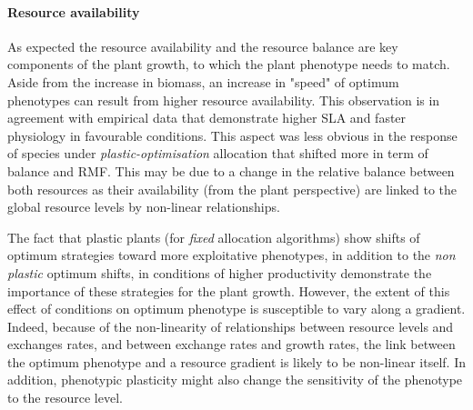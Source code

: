 \paragraph{Resource availability}

As expected the resource availability and the resource balance are key components of the plant growth, to which the plant phenotype needs to match. Aside from the increase in biomass, an increase in "speed" of optimum phenotypes can result from higher resource availability. This observation is in agreement with empirical data that demonstrate higher SLA and faster physiology in favourable conditions. This aspect was less obvious in the response of species under \textit{plastic-optimisation} allocation that shifted more in term of balance and RMF. This may be due to a change in the relative balance between both resources as their availability (from the plant perspective) are linked to the global resource levels by non-linear relationships.

The fact that plastic plants (for \textit{fixed} allocation algorithms) show shifts of optimum strategies toward more exploitative phenotypes, in addition to the \textit{non plastic} optimum shifts, in conditions of higher productivity demonstrate the importance of these strategies for the plant growth. However, the extent of this effect of conditions on optimum phenotype is susceptible to vary along a gradient. Indeed, because of the non-linearity of relationships between resource levels and exchanges rates, and between exchange rates and growth rates, the link between the optimum phenotype and a resource gradient is likely to be non-linear itself. In addition, phenotypic plasticity might also change the sensitivity of the phenotype to the resource level.



 



